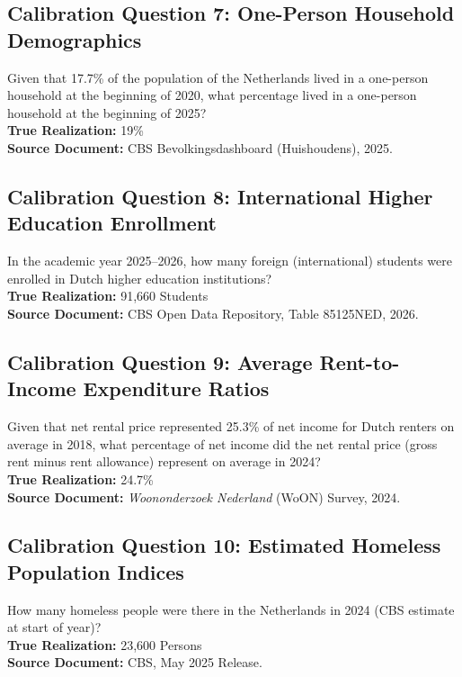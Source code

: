 \subsection*{Calibration Question 7: One-Person Household Demographics}
Given that 17.7\% of the population of the Netherlands lived in a one-person household at the beginning of 2020, what percentage lived in a one-person household at the beginning of 2025?\\\newline
\textbf{True Realization:} 19\%\\\newline
\textbf{Source Document:} CBS Bevolkingsdashboard (Huishoudens), 2025.

\subsection*{Calibration Question 8: International Higher Education Enrollment}
In the academic year 2025–2026, how many foreign (international) students were enrolled in Dutch higher education institutions?\\\newline
\textbf{True Realization:} 91,660 Students\\\newline
\textbf{Source Document:} CBS Open Data Repository, Table 85125NED, 2026.

\subsection*{Calibration Question 9: Average Rent-to-Income Expenditure Ratios}
Given that net rental price represented 25.3\% of net income for Dutch renters on average in 2018, what percentage of net income did the net rental price (gross rent minus rent allowance) represent on average in 2024?\\\newline
\textbf{True Realization:} 24.7\%\\\newline
\textbf{Source Document:} \textit{Woononderzoek Nederland} (WoON) Survey, 2024.

\subsection*{Calibration Question 10: Estimated Homeless Population Indices}
How many homeless people were there in the Netherlands in 2024 (CBS estimate at start of year)?\\\newline
\textbf{True Realization:} 23,600 Persons\\\newline
\textbf{Source Document:} CBS, May 2025 Release.


